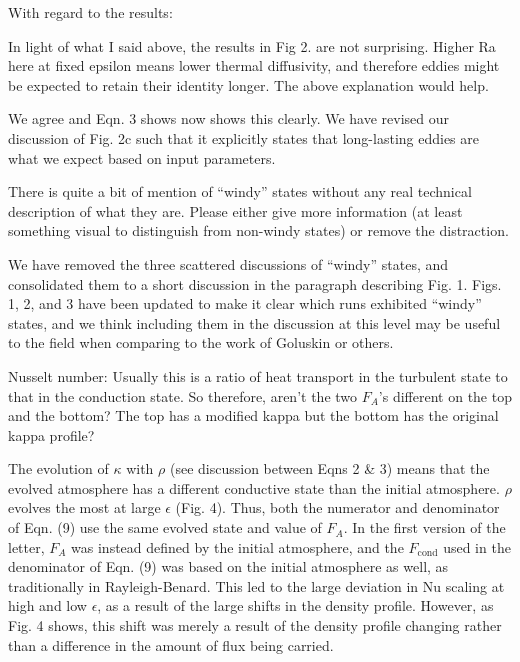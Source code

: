 \documentclass[aps, 11pt, singlecolumn]{revtex4-1} %
\begin{document}
\begin{singlespace}
\begin{myquotation}
With regard to the results:

In light of what I said above, the results in Fig 2. are not
surprising. Higher Ra here at fixed epsilon means lower thermal
diffusivity, and therefore eddies might be expected to retain their
identity longer. The above explanation would help.
\end{myquotation}
We agree and Eqn. 3 shows now shows this clearly.
We have revised our discussion of Fig. 2c such that it 
explicitly states that long-lasting eddies are what we expect based on 
input parameters.

\begin{myquotation}
There is quite a bit of mention of “windy” states without any real
technical description of what they are. Please either give more
information (at least something visual to distinguish from non-windy
states) or remove the distraction.
\end{myquotation}
We have removed the three scattered discussions of ``windy'' states,
and consolidated them to a short discussion in the paragraph describing
Fig. 1.  Figs. 1, 2, and 3 have been updated to make it clear which
runs exhibited ``windy'' states, and we think including them in the
discussion at this level may be useful to the field when comparing to
the work of Goluskin or others.

\begin{myquotation}
Nusselt number: Usually this is a ratio of heat transport in the
turbulent state to that in the conduction state. So therefore, aren’t
the two $F_A$’s different on the top and the bottom? The top has a
modified kappa but the bottom has the original kappa profile?
\end{myquotation}
The evolution of $\kappa$ with $\rho$ (see discussion between
Eqns 2 \& 3) means that the evolved atmosphere has a different
conductive state than the initial atmosphere.  $\rho$ evolves
the most at large $\epsilon$ (Fig. 4).
Thus, both the numerator and denominator of Eqn. (9) 
use the same evolved state and
value of $F_A$.  In the first version of the letter, 
$F_A$ was instead defined by the initial atmosphere, and
the $F_{\text{cond}}$ used in the denominator of Eqn. (9) was
based on the initial atmosphere as well, as traditionally
in Rayleigh-Benard.  This led to the
large deviation in Nu scaling at high and low $\epsilon$,
as a result of the large shifts in the density profile.
However, as Fig. 4 shows, this shift was merely a result of the
density profile changing rather than a difference in the
amount of flux being carried.


\end{singlespace}
\end{document}

